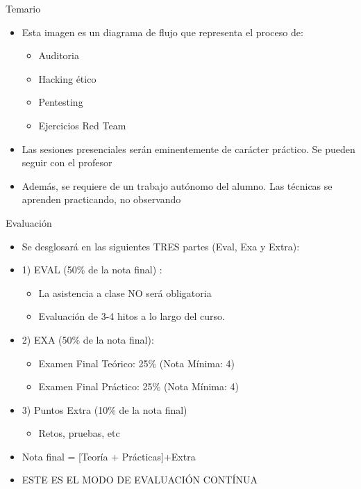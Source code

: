\documentclass[aspectratio=169,11pt]{beamer}
\begin{document}
\begin{frame}[allowframebreaks]{Temario}
\small
\begin{itemize}
  \item Esta imagen es un diagrama de flujo que representa el proceso de:
  \begin{itemize}
  \item Auditoria
  \item Hacking ético
  \item Pentesting
  \item Ejercicios Red Team
  
\end{itemize}
\item Las sesiones presenciales serán eminentemente de carácter práctico. Se pueden seguir con el profesor
  \item Además, se requiere de un trabajo autónomo del alumno. Las técnicas se aprenden practicando, no observando
  \end{itemize}
\end{frame}

\begin{frame}[allowframebreaks]{Evaluación}
\small
\begin{itemize}
  \item Se desglosará en las siguientes TRES partes (Eval, Exa y Extra):
  \item 1) EVAL (50\% de la nota final) :
  \begin{itemize}
    \item La asistencia a clase NO será obligatoria
    \item Evaluación de 3-4 hitos a lo largo del curso.
  \end{itemize}
  \item 2) EXA (50\% de la nota final):
  \begin{itemize}
    \item Examen Final Teórico: 25\% (Nota Mínima: 4)
    \item Examen Final Práctico: 25\% (Nota Mínima: 4)
  \end{itemize}
  \item 3) Puntos Extra (10\% de la nota final)
  \begin{itemize}
    \item Retos, pruebas, etc
  \end{itemize}
  \item Nota final = [Teoría + Prácticas]+Extra
  \item ESTE ES EL MODO DE EVALUACIÓN CONTÍNUA
\end{itemize}
\end{frame}
\end{document}
